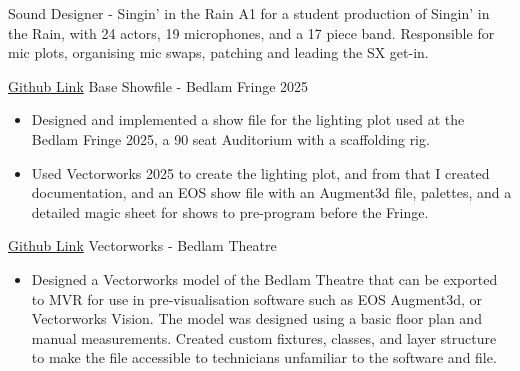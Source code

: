 \documentclass[../../cv-cs.tex]{subfiles}
\begin{document}
\cvlinkevent
{}
{Sound Designer - Singin' in the Rain}
{A1 for a student production of Singin' in the Rain, with 24 actors, 19 microphones, and a 17 piece band. Responsible for mic plots, organising mic swaps, patching and leading the SX get-in.}

\cvlinkevent
{\href{https://github.com/leon0241/Bedlam-Fringe-Showfile-25}{Github Link}}
{Base Showfile - Bedlam Fringe 2025}
{\begin{itemize}
    \item Designed and implemented a show file for the lighting plot used at the Bedlam Fringe 2025, a 90 seat Auditorium with a scaffolding rig.
    \item Used Vectorworks 2025 to create the lighting plot, and from that I created documentation, and an EOS show file with an Augment3d file, palettes, and a detailed magic sheet for shows to pre-program before the Fringe.
\end{itemize}}

\cvlinkevent
{\href{https://github.com/EdinburghUniversityTheatreCompany/bedlam-vwx}{Github Link}}
{Vectorworks - Bedlam Theatre}
{\begin{itemize}
    \item Designed a Vectorworks model of the Bedlam Theatre that can be exported to MVR for use in pre-visualisation software such as EOS Augment3d, or Vectorworks Vision. The model was designed using a basic floor plan and manual measurements. Created custom fixtures, classes, and layer structure to make the file accessible to technicians unfamiliar to the software and file.
\end{itemize}}
\end{document}
